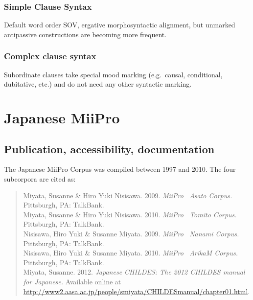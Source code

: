 \documentclass[a4paper, 11pt]{book}
\begin{document}
\subsubsection*{Simple Clause Syntax}
\begin{itemize*}
\item  Default word order SOV, ergative morphosyntactic alignment, but unmarked antipassive constructions are becoming more frequent.
\end{itemize*}

\subsubsection*{Complex clause syntax}

\begin{itemize*}
\item  Subordinate clauses take special mood marking (e.g.\ causal, conditional, dubitative, etc.) and do not need any other syntactic marking.
\end{itemize*}


\section{Japanese MiiPro}
\label{sec:Japanese MiiPro}

\subsection{Publication, accessibility, documentation}
The Japanese MiiPro Corpus \citep{Miyata_etal2009a, Nisisawa_etal2009a, Miyata_etal2010a, Nisisawa_etal2010a, Miyata2012a} was compiled between 1997 and 2010. The four subcorpora are cited as:

\begin{quote}
	Miyata, Susanne \& Hiro Yuki Nisisawa. 2009. \emph{MiiPro \textendash\ Asato Corpus.} Pittsburgh, PA: TalkBank. \\ %
	Miyata, Susanne \& Hiro Yuki Nisisawa. 2010. \emph{MiiPro \textendash\ Tomito Corpus.} Pittsburgh, PA: TalkBank. \\ %
	Nisisawa, Hiro Yuki \& Susanne Miyata. 2009. \emph{MiiPro \textendash\ Nanami Corpus.} Pittsburgh, PA: TalkBank. \\ %
	Nisisawa, Hiro Yuki \& Susanne Miyata. 2010. \emph{MiiPro \textendash\ ArikaM Corpus.} Pittsburgh, PA: TalkBank. \\ %
	Miyata, Susanne. 2012. \emph{Japanese CHILDES: The 2012 CHILDES manual for Japanese.} Available online at \url{http://www2.aasa.ac.jp/people/smiyata/CHILDESmanual/chapter01.html}.
\end{quote}
\end{document}
